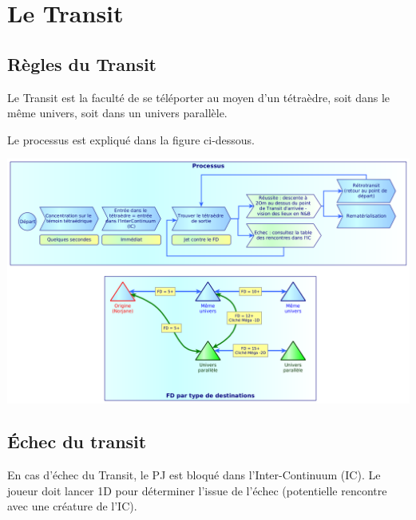 \documentclass[11pt]{article}
\begin{document}
\newpage
\section{Le Transit}

\subsection{Règles du Transit}

Le Transit est la faculté de se téléporter au moyen d'un tétraèdre, soit dans le même univers, soit dans un univers parallèle.

Le processus est expliqué dans la figure ci-dessous.

\begin{center}
\includegraphics[scale=0.21]{04-transit}
\end{center}

\subsection{Échec du transit}

En cas d'échec du Transit, le PJ est bloqué dans l'Inter-Continuum (IC). Le joueur doit lancer 1D pour déterminer l'issue de l'échec (potentielle rencontre avec une créature de l'IC).
\end{document}
